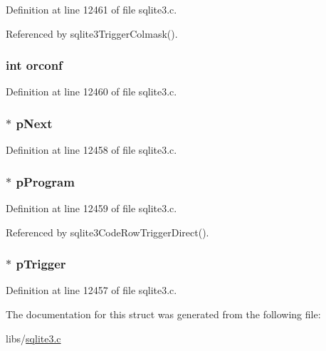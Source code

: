 Definition at line 12461 of file sqlite3.\+c.



Referenced by sqlite3\+Trigger\+Colmask().

\hypertarget{struct_trigger_prg_a46e6ed1d4c29799471bb33e2a1935986}{}
\subsubsection[{orconf}]{\setlength{\rightskip}{0pt plus 5cm}int orconf}\label{struct_trigger_prg_a46e6ed1d4c29799471bb33e2a1935986}


Definition at line 12460 of file sqlite3.\+c.

\hypertarget{struct_trigger_prg_ae2951c8e51b34769ac3c0f0a0478c4f0}{}
\subsubsection[{p\+Next}]{$\ast$ p\+Next}\label{struct_trigger_prg_ae2951c8e51b34769ac3c0f0a0478c4f0}


Definition at line 12458 of file sqlite3.\+c.

\hypertarget{struct_trigger_prg_a3b92cb4ee986d1dfaf28a5ade854311c}{}
\subsubsection[{p\+Program}]{$\ast$ p\+Program}\label{struct_trigger_prg_a3b92cb4ee986d1dfaf28a5ade854311c}


Definition at line 12459 of file sqlite3.\+c.



Referenced by sqlite3\+Code\+Row\+Trigger\+Direct().

\hypertarget{struct_trigger_prg_a93ec67e81c981e01944d8fc6ab564fec}{}
\subsubsection[{p\+Trigger}]{$\ast$ p\+Trigger}\label{struct_trigger_prg_a93ec67e81c981e01944d8fc6ab564fec}


Definition at line 12457 of file sqlite3.\+c.



The documentation for this struct was generated from the following file\+:\begin{DoxyCompactItemize}
\item 
libs/\hyperlink{sqlite3_8c}{sqlite3.\+c}\end{DoxyCompactItemize}
